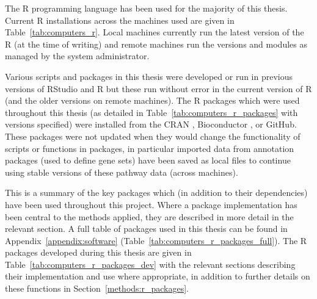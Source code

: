 The R programming language has been used for the majority of this thesis. Current R installations across the machines used are given in Table~\ref{tab:computers_r}. Local machines currently run the latest version of the R (at the time of writing) and remote machines run the versions and modules as managed by the system administrator.

Various scripts and packages in this thesis were developed or run in previous versions of RStudio and R but these run without error in the current version of R (and the older versions on remote machines). The R packages which were used throughout this thesis (as detailed in Table~\ref{tab:computers_r_packages} with versions specified) were installed from the \acrfull{CRAN} \citep{CRAN}, Bioconductor \citep[][version 3.4; BiocInstaller 1.24.0]{Gentleman2004}, or GitHub. These packages were not updated when they would change the functionality of scripts or functions in packages, in particular imported data from annotation packages (used to define gene sets) have been saved as local files to continue using stable versions of these \gls{pathway} data (across machines).

This is a summary of the key packages which (in addition to their dependencies) have been used throughout this project. Where a package implementation has been central to the methods applied, they are described in more detail in the relevant section. A full table of packages used in this thesis can be found in Appendix~\ref{appendix:software} (Table~\ref{tab:computers_r_packages_full}). The R packages developed during this thesis are given in Table~\ref{tab:computers_r_packages_dev} with the relevant sections describing their implementation and use where appropriate, in addition to further details on these functions in Section~\ref{methods:r_packages}. 

